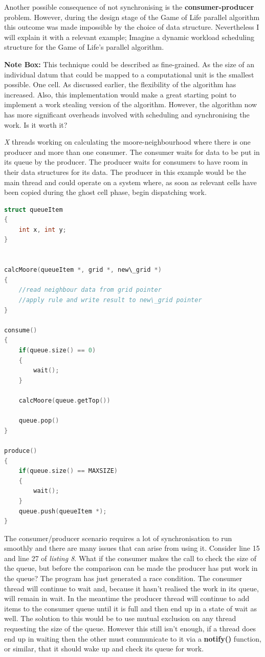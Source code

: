 \documentclass[11pt]{article} %
\begin{document}
Another possible consequence of not synchronising is the {\bf consumer-producer} problem. However, during the design stage of the Game of Life parallel algorithm this outcome was made impossible by the choice of data structure. Nevertheless I will explain it with a relevant example; Imagine a dynamic workload scheduling structure for the Game of Life's parallel algorithm.\cite[p10]{ref13}
\smallskip
\begin{mdframed}
{\bf Note Box: } This technique could be described as fine-grained. As the size of an individual datum that could be mapped to a computational unit is the smallest possible. One cell. As discussed earlier, the flexibility of the algorithm has increased. Also, this implementation would make a great starting point to implement a work stealing version of the algorithm. However, the algorithm now has more significant overheads involved with scheduling and synchronising the work. Is it worth it?
\end{mdframed}
\smallskip
{\it X} threads working on calculating the moore-neighbourhood where there is one producer and more than one consumer. The consumer waits for data to be put in its queue by the producer.  The producer waits for consumers to have room in their data structures for its data. The producer in this example would be the main thread and could operate on a system where, as soon as relevant cells have been copied during the ghost cell phase, begin dispatching work.
\begin{lstlisting}[language=C, caption={Dynamic Work allocation pseudo-code for the Game of Life}]
struct queueItem
{
    int x, int y;
}


calcMoore(queueItem *, grid *, new\_grid *)
{
    //read neighbour data from grid pointer
    //apply rule and write result to new\_grid pointer
}

consume()
{
    if(queue.size() == 0)
    {
        wait();
    }
    
    calcMoore(queue.getTop())
    
    queue.pop()
}

produce()
{
    if(queue.size() == MAXSIZE)
    {
        wait();
    }
    queue.push(queueItem *);
}
\end{lstlisting}
The consumer/producer scenario requires a lot of synchronisation to run smoothly and there are many issues that can arise from using it. Consider line 15 and line 27 of {\it listing 8}. What if the consumer makes the call to check the size of the queue, but before the comparison can be made the producer has put work in the queue? The program has just generated a race condition. The consumer thread will continue to wait and, because it hasn't realised the work in its queue, will remain in wait. In the meantime the producer thread will continue to add items to the consumer queue until it is full and then end up in a state of wait as well. The solution to this would be to use mutual exclusion on any thread requesting the size of the queue. However this still isn't enough, if a thread does end up in waiting then the other must communicate to it via a {\bf notify()} function, or similar, that it should wake up and check its queue for work.\cite[p18]{ref14}
\end{document}
